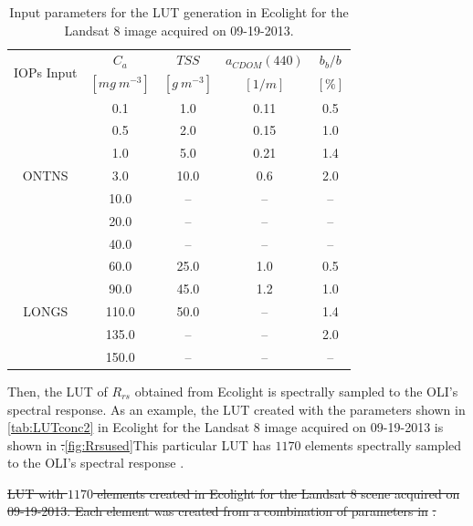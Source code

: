 \documentclass[onecolumn,3p,letterpaper,11pt]{elsarticle} %
\providecommand{\DIFaddtex}[1]{{\protect\color{blue}\uwave{#1}}} %
\providecommand{\DIFdeltex}[1]{{\protect\color{red}\sout{#1}}}                      %
\providecommand{\DIFaddbegin}{} %
\providecommand{\DIFaddend}{} %
\providecommand{\DIFdelbegin}{} %
\providecommand{\DIFdelend}{} %
\providecommand{\DIFdelFL}[1]{\DIFdel{#1}} %
\providecommand{\DIFadd}[1]{\texorpdfstring{\DIFaddtex{#1}}{#1}} %
\providecommand{\DIFdel}[1]{\texorpdfstring{\DIFdeltex{#1}}{}} %
\begin{document}
\begin{table}[htb]
\caption{Input parameters for the LUT generation in Ecolight for the Landsat 8 image acquired on 09-19-2013. \label{tab:LUTconc2}} 
\small
\centering
    \begin{tabular}{ccccc}
    \hline \hline
    \multirow{2}{*}{IOPs Input} & \bfseries{$C_a$}    & \bfseries{$TSS$}  & \bfseries{$a_{CDOM}(440)$} & \bfseries{$b_b/b$}\\
               & $[mg~m^{-3}]$      & $[g~m^{-3}]$      &   $[1/m]$                  &  $[\%]$           \\ \hline \hline
\multirow{7}{*}{ONTNS} & 0.1   & 1.0  &  0.11 &  0.5 \\
                       & 0.5   & 2.0  &  0.15 &  1.0 \\
                       & 1.0   & 5.0  &  0.21 &  1.4 \\
                       & 3.0   & 10.0 &  0.6  &  2.0 \\
                       & 10.0  & --   &  --   &  --  \\
                       & 20.0  & --   &  --   &  --  \\
                       & 40.0  & --   &  --   &  --  \\ \hline

\multirow{5}{*}{LONGS} & 60.0  & 25.0 & 1.0   &  0.5 \\  
                       & 90.0  & 45.0 & 1.2   &  1.0 \\  
                       & 110.0 & 50.0 & --    &  1.4 \\  
                       & 135.0 & --   & --    &  2.0 \\  
                       & 150.0 & --   & --    &  --  \\  \hline \hline    
    \end{tabular}
	\end{table}

Then, the LUT of $R_{rs}$ obtained from Ecolight is spectrally sampled to the OLI's spectral response. As an example, the LUT created with the parameters shown in \autoref{tab:LUTconc2} in Ecolight for the Landsat 8 image acquired on 09-19-2013 is shown in \DIFdelbegin %
\DIFdel{.}\DIFdelend \DIFaddbegin \autoref{fig:Rrsused}\DIFadd{.(a). }\DIFaddend This particular LUT has $1170$ elements spectrally sampled to the OLI's spectral response\DIFdelbegin %
\DIFdelend .

\DIFdelbegin %
{%
\DIFdelFL{LUT with $1170$ elements created in Ecolight for the Landsat 8 scene acquired on 09-19-2013. Each element was created from a combination of parameters in }%
\DIFdelFL{.}}
\end{document}
